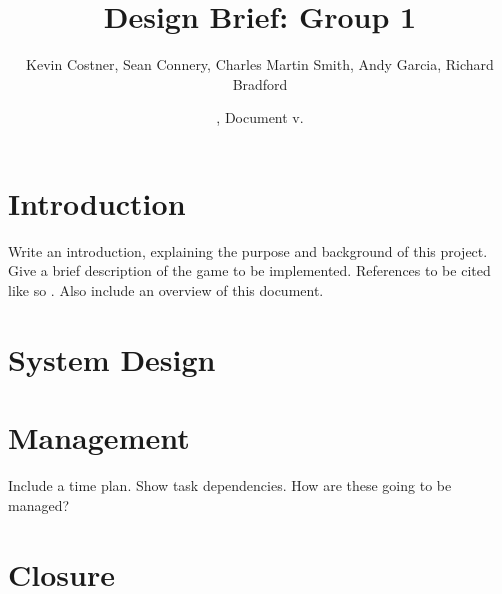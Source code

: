 \documentclass[11pt,a4paper,twocolumn]{article}
\title{Design Brief: Group 1}
\author{
   Kevin Costner,
   Sean Connery,
   Charles Martin Smith,
   Andy Garcia,
   Richard Bradford
   }
\date{\svnMaxToday, Document v.\svnInfoMaxRevision}
\begin{document}
\maketitle


\section{Introduction}
Write an introduction, explaining the purpose and background of this project.
Give a brief description of the game to be implemented.
References to be cited like so \cite{stroustrup2000}.
Also include an overview of this document.

\section{System Design}

\section{Management}
Include a time plan.
Show task dependencies.
How are these going to be managed?

\section{Closure}



\end{document}
